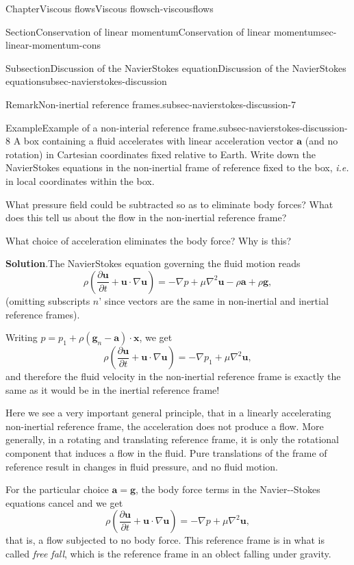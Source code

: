 \documentclass[oneside,10pt,]{book}
\newcommand{\blocktitlefont}{\relax}
\numberwithin{equation}{section}
\newcommand{\pd}[2]{\frac{\partial#1}{\partial#2}}
\newcommand{\bx}{\boldsymbol{x}}
\newcommand{\bu}{\boldsymbol{u}}
\newcommand{\ba}{\boldsymbol{a}}
\newcommand{\bg}{\boldsymbol{g}}
\begin{document}
\begin{chapterptx}{Chapter}{Viscous flows}{}{Viscous flows}{}{}{ch-viscousflows}
\begin{sectionptx}{Section}{Conservation of linear momentum}{}{Conservation of linear momentum}{}{}{sec-linear-momentum-cons}
\begin{subsectionptx}{Subsection}{Discussion of the Navier\textendash{}Stokes equation}{}{Discussion of the Navier\textendash{}Stokes equation}{}{}{subsec-navierstokes-discussion}
\begin{remark}{Remark}{Non-inertial reference frames.}{subsec-navierstokes-discussion-7}
\end{remark}
\begin{example}{Example}{Example of a non-interial reference frame.}{subsec-navierstokes-discussion-8}%
A box containing a fluid accelerates with linear acceleration vector \(\ba\) (and no rotation) in Cartesian coordinates fixed relative to Earth. Write down the Navier\textendash{}Stokes equations in the non-inertial frame of reference fixed to the box, \emph{i.e.} in local coordinates within the box.%
\par
What pressure field could be subtracted so as to eliminate body forces? What does this tell us about the flow in the non-inertial reference frame?%
\par
What choice of acceleration eliminates the body force? Why is this?%
\par\smallskip%
\noindent\textbf{\blocktitlefont Solution}.\hypertarget{subsec-navierstokes-discussion-8-3}{}\quad{}The Navier\textendash{}Stokes equation governing the fluid motion reads%
\begin{equation*}
\rho\left(\pd{\bu}{t}+\bu\cdot\nabla\bu\right)
=-\nabla p+\mu\nabla^2\bu-\rho\ba+\rho\bg,
\end{equation*}
(omitting subscripts \textasciigrave{}\(n\)' since vectors are the same in non-inertial and inertial reference frames).%
\par
Writing \(p=p_1+\rho(\bg_n-\ba)\cdot\bx\), we get%
\begin{equation*}
\rho\left(\pd{\bu}{t}+\bu\cdot\nabla\bu\right)
=-\nabla p_1+\mu\nabla^2\bu,
\end{equation*}
and therefore the fluid velocity in the non-inertial reference frame is exactly the same as it would be in the inertial reference frame!%
\par
Here we see a very important general principle, that in a linearly accelerating non-inertial reference frame, the acceleration does not produce a flow. More generally, in a rotating and translating reference frame, it is only the rotational component that induces a flow in the fluid. Pure translations of the frame of reference result in changes in fluid pressure, and no fluid motion.%
\par
For the particular choice \(\ba=\bg\), the body force terms in the Navier-{}-{}Stokes equations cancel and we get%
\begin{equation*}
\rho\left(\pd{\bu}{t}+\bu\cdot\nabla\bu\right)
=-\nabla p+\mu\nabla^2\bu,
\end{equation*}
that is, a flow subjected to no body force. This reference frame is in what is called \emph{free fall}, which is the reference frame in an oblect falling under gravity.%

\end{example}
\end{subsectionptx}
\end{sectionptx}
\end{chapterptx}
\end{document}
